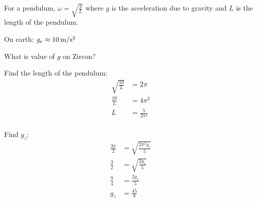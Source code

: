 \documentclass[fleqn,addpoints]{exam}
\begin{document}
\begin{questions}
\begin{parts}
        \bonuspart[4]
          For a pendulum, $\omega = \sqrt{ \frac{g}{L}}$ where $g$ is the acceleration due to gravity and
          $L$ is the length of the pendulum.

          On earth: $g_e \approx \unit[10]{m/s^2}$

          What is value of $g$ on Zircon?

          \begin{solution}
            Find the length of the pendulum:
            \begin{align*}
              \sqrt{ \frac{10}{L} } & = 2 \pi \\
              \frac{10}{L}          & = 4 \pi^2 \\
              L                     & = \frac{5}{2 \pi^2} \\
            \end{align*}

            Find $g_z$:
            \begin{align*}
              \frac{3 \pi}{2} & = \sqrt{ \frac{2 \pi^2 g_z}{5}} \\
              \frac{3}{2}     & = \sqrt{ \frac{2 g_z}{5}} \\
              \frac{9}{4}     & = \frac{2 g_z}{5} \\
              g_z             & = \frac{45}{8} \\
            \end{align*}

          \end{solution}
      \end{parts}

  \end{questions}
\end{document}
